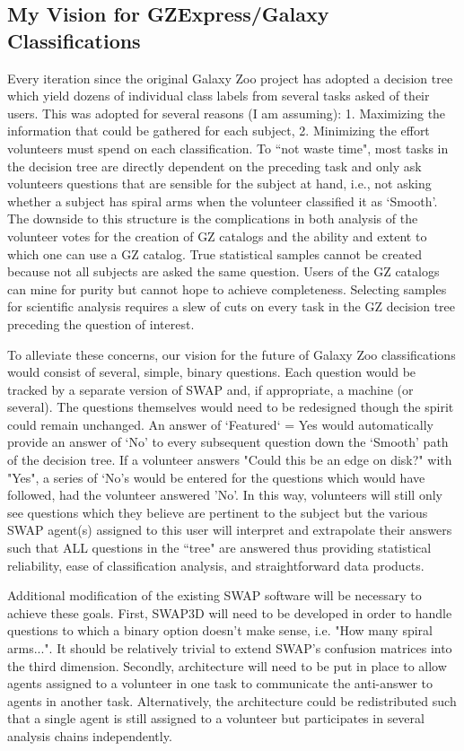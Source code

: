 \documentclass[twocolumn]{aastex6}
\begin{document}
\subsection{My Vision for GZExpress/Galaxy Classifications}
Every iteration since the original Galaxy Zoo project has adopted a decision tree
which yield dozens of individual class labels from several tasks asked of their users. 
This was adopted for several reasons (I am assuming): 1. Maximizing the information 
that could be gathered for each subject, 2. Minimizing the effort volunteers must 
spend on each classification. To ``not waste time", most tasks in the decision tree
are directly dependent on the preceding task and only ask volunteers questions that
are sensible for the subject at hand, i.e., not asking whether a subject has spiral arms
when the volunteer classified it as `Smooth'. The downside to this structure is the 
complications in both analysis of the volunteer votes for the creation of GZ catalogs
and the ability and extent to which one can use a GZ catalog. True 
statistical samples cannot be created because not all subjects are asked the same 
question. Users of the GZ catalogs can mine for purity but cannot hope to achieve
completeness. Selecting samples for scientific analysis requires a slew of cuts on 
every task in the GZ decision tree preceding the question of interest. 

To alleviate these concerns, our vision for the future of Galaxy Zoo classifications
would consist of several, simple, binary questions. Each question would be tracked by a 
separate version of SWAP and, if appropriate, a machine (or several). The questions
themselves would need to be redesigned though the spirit could remain unchanged. 
An answer of `Featured` = Yes would automatically provide an answer of  `No' to every 
subsequent question down the `Smooth' path of the decision tree. 
If a volunteer answers "Could this be an edge on disk?" with "Yes", a series of `No's 
would be entered for the questions which would have followed, had the volunteer answered 'No'.
In this way, volunteers will still only see questions which they believe are pertinent to the 
subject but the various SWAP agent(s) assigned to this user will interpret and 
extrapolate their answers such that ALL questions in the ``tree" are answered thus
providing statistical reliability, ease of classification analysis, and straightforward 
data products.  

Additional modification of the existing SWAP software will be necessary to achieve
these goals. First, SWAP3D will need to be developed in order to handle questions to 
which a binary option doesn't make sense, i.e. "How many spiral arms...". It should be 
relatively trivial to extend SWAP's confusion matrices into the third dimension. 
Secondly, architecture will need to be put in place to  allow agents assigned to a 
volunteer in one task to communicate the anti-answer to agents in another task. 
Alternatively, the architecture could be redistributed such that a single agent is
still assigned to a volunteer but participates in several analysis chains independently. 
\end{document}

